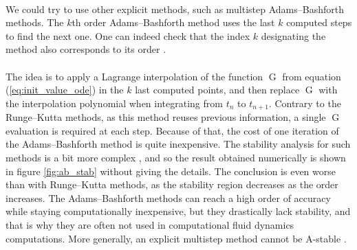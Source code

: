         \paragraph{}
        We could try to use other explicit methods, such as multistep Adams--Bashforth methods.
        The $k$th order Adams--Bashforth method uses the last $k$ computed steps to find the next one.
        One can indeed check that the index $k$ designating the method also corresponds to its order \cite{HairerNorsettWanner1993}.

        \paragraph{}
        The idea is to apply a Lagrange interpolation of the function $\operatorname{G}$ from equation (\ref{eq:init_value_ode}) in the $k$ last computed points, and then replace $\operatorname{G}$ with the interpolation polynomial when integrating from $t_n$ to $t_{n+1}$.
        Contrary to the Runge--Kutta methods, as this method reuses previous information, a single $\operatorname{G}$ evaluation is required at each step.
        Because of that, the cost of one iteration of the Adams--Bashforth method is quite inexpensive.
        The stability analysis for such methods is a bit more complex \cite{HairerNorsettWanner1993, HairerWanner1996}, and so the result obtained numerically is shown in figure \ref{fig:ab_stab} without giving the details.
        The conclusion is even worse than with Runge--Kutta methods, as the stability region decreases as the order increases.
        The Adams--Bashforth methods can reach a high order of accuracy while staying computationally inexpensive, but they drastically lack stability, and that is why they are often not used in computational fluid dynamics computations.
        More generally, an explicit multistep method cannot be A-stable \cite{Dahlquist1963}.

